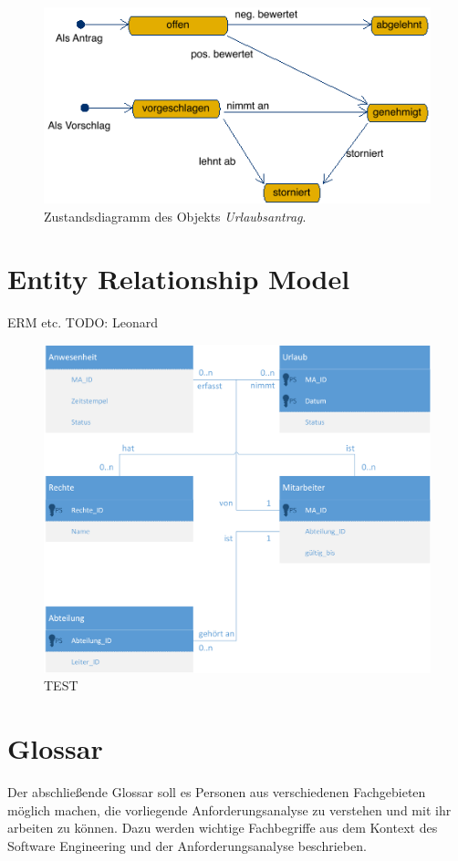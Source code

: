 \vspace{1cm}
\begin{figure}[hbp]
	\centering
	\includegraphics[width=0.9\linewidth]{UML/Export/Urlaubsantrag.png}
	\caption{Zustandsdiagramm des Objekts \textit{Urlaubsantrag}.}
	\label{Uantrag}
\end{figure}

\newpage

\chapter{Entity Relationship Model}
ERM etc. TODO: Leonard

\begin{figure}[hbp]
	\centering
	\includegraphics[width=1\linewidth]{UML/Export/erm.png}
	\caption{TEST}
	\label{ERM}
\end{figure}

\chapter{Glossar}
Der abschlie{\ss}ende Glossar soll es Personen aus verschiedenen Fachgebieten m\"oglich machen, die vorliegende Anforderungsanalyse zu verstehen und mit ihr arbeiten zu k\"onnen. Dazu werden wichtige Fachbegriffe aus dem Kontext des Software Engineering und der Anforderungsanalyse beschrieben.

